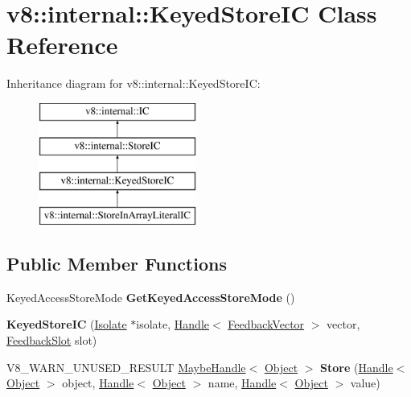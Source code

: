 \hypertarget{classv8_1_1internal_1_1KeyedStoreIC}{}\section{v8\+:\+:internal\+:\+:Keyed\+Store\+IC Class Reference}
\label{classv8_1_1internal_1_1KeyedStoreIC}
Inheritance diagram for v8\+:\+:internal\+:\+:Keyed\+Store\+IC\+:\begin{figure}[H]
\begin{center}
\leavevmode
\includegraphics[height=4.000000cm]{classv8_1_1internal_1_1KeyedStoreIC}
\end{center}
\end{figure}
\subsection*{Public Member Functions}
\begin{DoxyCompactItemize}
\item 
\mbox{\label{classv8_1_1internal_1_1KeyedStoreIC_a0d99a86f21d342854c18ee615f814287}} 
Keyed\+Access\+Store\+Mode {\bfseries Get\+Keyed\+Access\+Store\+Mode} ()
\item 
\mbox{\label{classv8_1_1internal_1_1KeyedStoreIC_ab61e9196c644762c3ede7de2f895b7ad}} 
{\bfseries Keyed\+Store\+IC} (\mbox{\hyperlink{classv8_1_1internal_1_1Isolate}{Isolate}} $\ast$isolate, \mbox{\hyperlink{classv8_1_1internal_1_1Handle}{Handle}}$<$ \mbox{\hyperlink{classv8_1_1internal_1_1FeedbackVector}{Feedback\+Vector}} $>$ vector, \mbox{\hyperlink{classv8_1_1internal_1_1FeedbackSlot}{Feedback\+Slot}} slot)
\item 
\mbox{\label{classv8_1_1internal_1_1KeyedStoreIC_a10e43cfebb31810bfba3ff4ae22e0225}} 
V8\+\_\+\+W\+A\+R\+N\+\_\+\+U\+N\+U\+S\+E\+D\+\_\+\+R\+E\+S\+U\+LT \mbox{\hyperlink{classv8_1_1internal_1_1MaybeHandle}{Maybe\+Handle}}$<$ \mbox{\hyperlink{classv8_1_1internal_1_1Object}{Object}} $>$ {\bfseries Store} (\mbox{\hyperlink{classv8_1_1internal_1_1Handle}{Handle}}$<$ \mbox{\hyperlink{classv8_1_1internal_1_1Object}{Object}} $>$ object, \mbox{\hyperlink{classv8_1_1internal_1_1Handle}{Handle}}$<$ \mbox{\hyperlink{classv8_1_1internal_1_1Object}{Object}} $>$ name, \mbox{\hyperlink{classv8_1_1internal_1_1Handle}{Handle}}$<$ \mbox{\hyperlink{classv8_1_1internal_1_1Object}{Object}} $>$ value)
\end{DoxyCompactItemize}
